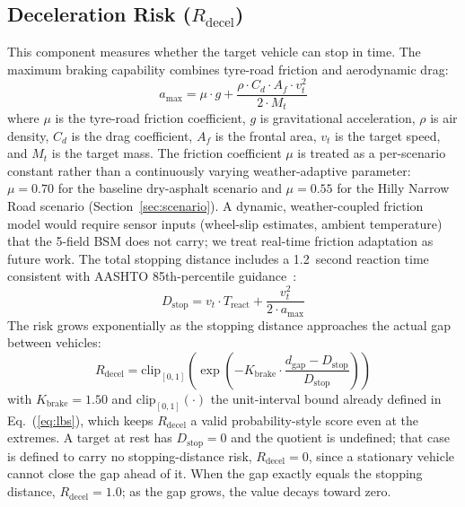 \documentclass[sn-mathphys-num,Numbered,iicol]{sn-jnl}
\begin{document}
\subsection{Deceleration Risk (\texorpdfstring{$R_{\mathrm{decel}}$}{R\_decel})}\label{sec:rdecel}
This component measures whether the target vehicle can stop in time. The maximum braking capability combines tyre-road friction and aerodynamic drag:
\begin{equation}
  a_{\max} = \mu\cdot g + \frac{\rho\cdot C_d\cdot A_f\cdot v_t^2}{2\cdot M_t}
\end{equation}
where $\mu$ is the tyre-road friction coefficient, $g$ is gravitational acceleration, $\rho$ is air density, $C_d$ is the drag coefficient, $A_f$ is the frontal area, $v_t$ is the target speed, and $M_t$ is the target mass. The friction coefficient $\mu$ is treated as a per-scenario constant rather than a continuously varying weather-adaptive parameter: $\mu = 0.70$ for the baseline dry-asphalt scenario and $\mu = 0.55$ for the Hilly Narrow Road scenario (Section~\ref{sec:scenario}). A dynamic, weather-coupled friction model would require sensor inputs (wheel-slip estimates, ambient temperature) that the 5-field BSM does not carry; we treat real-time friction adaptation as future work. The total stopping distance includes a 1.2~second reaction time consistent with AASHTO 85th-percentile guidance~\cite{aashto2018}:
\begin{equation}
  D_{\mathrm{stop}} = v_t\cdot T_{\mathrm{react}} + \frac{v_t^2}{2\cdot a_{\max}}
\end{equation}
The risk grows exponentially as the stopping distance approaches the actual gap between vehicles:
\begin{equation}
  R_{\mathrm{decel}} = \mathrm{clip}_{[0,1]}\!\left(
    \exp\!\left(-K_{\mathrm{brake}} \cdot
       \frac{d_{\mathrm{gap}} - D_{\mathrm{stop}}}{D_{\mathrm{stop}}}\right)
  \right)
\end{equation}
with $K_{\mathrm{brake}} = 1.50$ and $\mathrm{clip}_{[0,1]}(\cdot)$ the unit-interval bound already defined in Eq.~(\ref{eq:lbs}), which keeps $R_{\mathrm{decel}}$ a valid probability-style score even at the extremes. A target at rest has $D_{\mathrm{stop}} = 0$ and the quotient is undefined; that case is defined to carry no stopping-distance risk, $R_{\mathrm{decel}} = 0$, since a stationary vehicle cannot close the gap ahead of it. When the gap exactly equals the stopping distance, $R_{\mathrm{decel}} = 1.0$; as the gap grows, the value decays toward zero.
\end{document}
